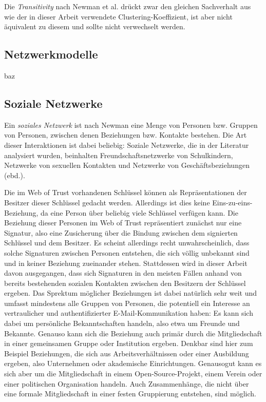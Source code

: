 Die \emph{Transitivity} nach Newman et al. dr\"uckt zwar den gleichen
Sachverhalt aus wie der in dieser Arbeit verwendete
Clustering-Koeffizient, ist aber nicht \"aquivalent zu diesem und
sollte nicht verwechselt werden.

\subsection{Netzwerkmodelle}
\label{sec:netzwerkmodelle}

\cite{Barabasi1999} 
baz

\subsection{Soziale Netzwerke}
\label{sec:soziale-netzwerke}

Ein \emph{soziales Netzwerk} ist nach Newman\cite{newman:167} eine
Menge von Personen bzw. Gruppen von Personen, zwischen denen
Beziehungen bzw. Kontakte bestehen. Die Art dieser Interaktionen ist
dabei beliebig: Soziale Netzwerke, die in der Literatur analysiert
wurden, beinhalten Freundschaftsnetzwerke von Schulkindern, Netzwerke
von sexuellen Kontakten und Netzwerke von Gesch\"aftsbeziehungen
(ebd.).

Die im Web of Trust vorhandenen Schl\"ussel k\"onnen als
Repr\"asentationen der Besitzer dieser Schl\"ussel gedacht
werden. Allerdings ist dies keine Eins-zu-eins-Beziehung, da eine
Person \"uber beliebig viele Schl\"ussel verf\"ugen kann. Die
Beziehung dieser Personen im Web of Trust repr\"asentiert zun\"achst
nur eine Signatur, also eine Zusicherung \"uber die Bindung zwischen
dem signierten Schl\"ussel und dem Besitzer. Es scheint allerdings
recht unwahrscheinlich, dass solche Signaturen zwischen Personen
entstehen, die sich v\"ollig unbekannt sind und in keiner Beziehung
zueinander stehen. Stattdessen wird in dieser Arbeit davon
ausgegangen, dass sich Signaturen in den meisten F\"allen anhand von
bereits bestehenden sozialen Kontakten zwischen den Besitzern der
Schl\"ussel ergeben\cite{Capkun2002}. Das Sprektum m\"oglicher Beziehungen ist dabei
nat\"urlich sehr weit und umfasst mindestens alle Gruppen von
Personen, die potentiell ein Interesse an vertraulicher und
authentifizierter E-Mail-Kommunikation haben: Es kann sich dabei um
pers\"onliche Bekanntschaften handeln, also etwa um Freunde und
Bekannte. Genauso kann sich die Beziehung auch prim\"ar durch die
Mitgliedschaft in einer gemeinsamen Gruppe oder Institution
ergeben. Denkbar sind hier zum Beispiel Beziehungen, die sich aus
Arbeitsverh\"altnissen oder einer Ausbildung ergeben, also Unternehmen
oder akademische Einrichtungen. Genausogut kann es sich aber um die
Mitgliedschaft in einem Open-Source-Projekt, einem Verein oder einer
politischen Organisation handeln. Auch Zusammenh\"ange, die nicht
\"uber eine formale Mitgliedschaft in einer festen Gruppierung
entstehen, sind m\"oglich.

